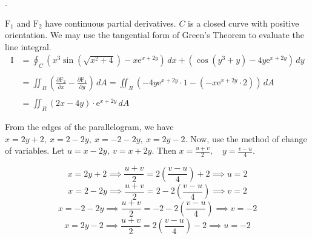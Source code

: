 \documentclass{article}
\begin{document}
\hfill

.
\begin{center}
\end{center}

\newpage

\noindent $\mathrm{F}_1$ and $\mathrm{F}_2$ have continuous partial derivatives. $C$ is a closed curve with positive orientation. We may use the tangential form of Green's Theorem to evaluate the line integral.
\begin{align}\mathrm{I}&=\oint_C\left(x^3\sin\left(\sqrt{x^2+4}\right)-x\mathrm{e}^{x+2y}\right)\,dx + \left(\cos\left(y^3+y\right)-4y\mathrm{e}^{x+2y}\right)\,dy\nonumber\\\nonumber\\&=\iint_R\left(\frac{\partial\mathrm{F}_2}{\partial x}-\frac{\partial\mathrm{F}_1}{\partial y}\right)\,dA=\iint_R\left(-4y\mathrm{e}^{x+2y}\cdot1-\left(-x\mathrm{e}^{x+2y}\cdot2\right)\right)\,dA\nonumber\\\nonumber\\&=\iint_R(2x-4y)\cdot\mathrm{e}^{x+2y}\,dA\end{align}

\noindent From the edges of the parallelogram, we have $\displaystyle x=2y+2,\:x=2-2y,\:x=-2-2y,\:x=2y-2$. Now, use the method of change of variables. Let $\displaystyle u=x-2y,\:v=x+2y$. Then $\displaystyle x=\frac{u+v}2,\quad y=\frac{v-u}{4}$.

\[x=2y+2\implies \frac{u+v}2=2\left(\frac{v-u}4\right)+2\implies u=2\]
\[x=2-2y\implies \frac{u+v}2=2-2\left(\frac{v-u}4\right)\implies v=2\]
\[x=-2-2y\implies \frac{u+v}2=-2-2\left(\frac{v-u}4\right)\implies v=-2\]
\[x=2y-2\implies \frac{u+v}2=2\left(\frac{v-u}4\right)-2\implies u=-2\]
\end{document}
